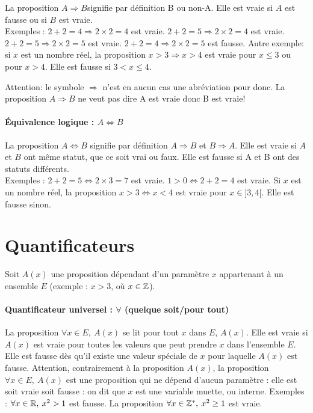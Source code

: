 La proposition \og $A \Rightarrow B$\fg signifie par définition \og B ou non-A\fg. Elle est vraie si $A$ est fausse ou si $B$ est vraie.\\
Exemples :  $2+2=4 \Rightarrow 2\times2 = 4$ est vraie. $2+2=5 \Rightarrow 2\times2 = 4$ est vraie. $2+2=5 \Rightarrow 2\times2 = 5$ est vraie. $2+2=4 \Rightarrow 2\times2 = 5$ est fausse. Autre exemple:  si $x$ est un nombre réel, la proposition $x>3 \Rightarrow x>4$  est vraie pour $x\leq 3$ ou pour $x>4$. Elle est fausse si $3<x\leq 4$.

Attention: le symbole $\Rightarrow$ n'est en aucun cas une abréviation pour \og donc\fg. La proposition $A \Rightarrow B$ ne veut pas dire \og  A est vraie donc B est vraie\fg !

\paragraph{\'Equivalence logique : \og $A \Leftrightarrow B$\fg}

La proposition \og$A \Leftrightarrow B$\fg{} signifie par définition \og $A \Rightarrow B$ et $B \Rightarrow A$\fg{}. Elle est  vraie si $A$ et $B$ ont même statut, que ce soit vrai ou faux. Elle est fausse si A et B ont des statuts différents.\\
Exemples : $2+2=5 \Leftrightarrow 2\times 3 = 7$ est vraie. $1>0 \Leftrightarrow 2+2=4$ est vraie. Si $x$ est un nombre réel, la proposition $x>3 \Leftrightarrow x<4$ est vraie pour $x\in]3,4[$. Elle est fausse sinon.

\section{Quantificateurs}
Soit $A(x)$ une proposition dépendant d'un paramètre $x$ appartenant à un ensemble $E$ (exemple :  \og $x>3$\fg, où $x \in \mathbb{Z}$).

\paragraph{Quantificateur universel : $\forall$ (quelque soit/pour tout)}

La proposition \og$\forall x\in E,\:A(x)$\fg{} se lit \og pour tout $x$ dans $E$, $A(x)$\fg. Elle est vraie si $A(x)$ est vraie pour toutes les valeurs que peut prendre $x$ dans l'ensemble $E$. Elle est fausse dès qu'il existe une valeur spéciale de $x$ pour laquelle $A(x)$ est fausse.
Attention, contrairement à la proposition $A(x)$, la proposition $\forall x\in E,\:A(x)$ est une proposition qui ne dépend d'aucun paramètre : elle est soit vraie soit fausse : on dit que $x$ est une variable muette, ou interne.
Exemples :  $\forall x\in \mathbb{R},\: x^2>1$ est fausse. La proposition $\forall x\in \mathbb{Z}^*,\: x^2\geq 1$ est vraie.


